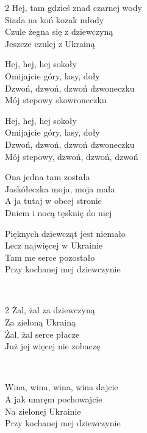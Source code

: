 
\begin{multicols}{2}
\ve{}
Hej, tam gdzieś znad czarnej wody\\
Siada na koń kozak młody\\
Czule żegna się z dziewczyną\\
Jeszcze czulej z Ukrainą
 
\cho{}
Hej, hej, hej sokoły\\
Omijajcie góry, lasy, doły\\
Dzwoń, dzwoń, dzwoń dzwoneczku\\
Mój stepowy skowroneczku
 
Hej, hej, hej sokoły\\
Omijajcie góry, lasy, doły\\
Dzwoń, dzwoń, dzwoń dzwoneczku\\
Mój stepowy, dzwoń, dzwoń, dzwoń
 
\ve{}
Ona jedna tam została\\
Jaskółeczka moja, moja mała\\
A ja tutaj w obcej stronie\\
Dniem i nocą tęsknię do niej

\cho{}

\ve{}
Pięknych dziewcząt jest niemało\\
Lecz najwięcej w Ukrainie\\
Tam me serce pozostało\\
Przy kochanej mej dziewczynie
 
\cho{}
~

\vfill
\columnbreak


\end{multicols}

\begin{multicols}{2}
\ve{}
Żal, żal za dziewczyną\\
Za zieloną Ukrainą\\
Żal, żal serce płacze\\
Już jej więcej nie zobaczę
 
\cho{}
~

\vfill
\columnbreak
 
\ve{}
Wina, wina, wina, wina dajcie\\
A jak umręm pochowajcie\\
Na zielonej Ukrainie\\
Przy kochanej mej dziewczynie

\cho{}
~
\end{multicols}
\esong{}
